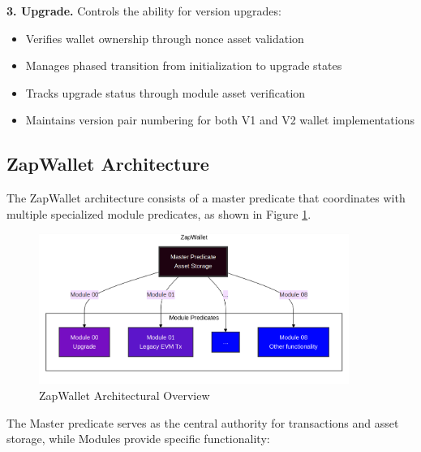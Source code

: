 \textbf{3. Upgrade.} Controls the ability for version upgrades:
\begin{itemize}
    \item Verifies wallet ownership through nonce asset validation
    \item Manages phased transition from initialization to upgrade states
    \item Tracks upgrade status through module asset verification
    \item Maintains version pair numbering for both V1 and V2 wallet implementations
\end{itemize}


\subsection{ZapWallet Architecture}

The ZapWallet architecture consists of a master predicate that coordinates with multiple specialized module predicates,
as shown in Figure \ref{fig:zapwallet-structure}.

\begin{figure}[h]
    \centering
    \includegraphics[width=0.9\textwidth]{images/architecture-structure2.png}
    \caption{ZapWallet Architectural Overview}
    \label{fig:zapwallet-structure}
\end{figure}

The Master predicate serves as the central authority for transactions and asset storage, while Modules provide specific functionality:

